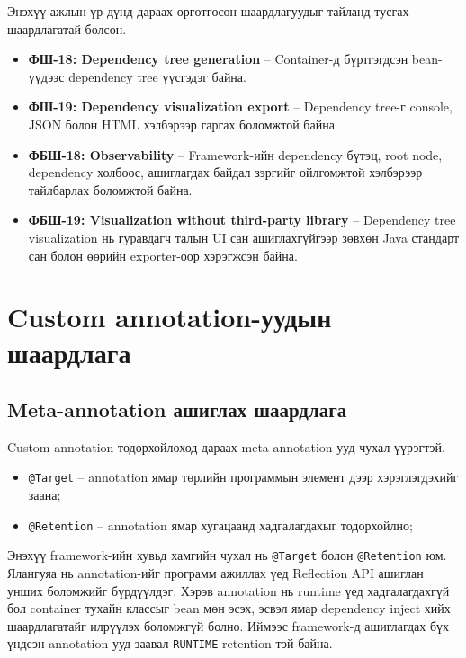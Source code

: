 Энэхүү ажлын үр дүнд дараах өргөтгөсөн шаардлагуудыг тайланд тусгах шаардлагатай болсон.
\begin{itemize}
    \item \textbf{ФШ-18: Dependency tree generation} -- Container-д бүртгэгдсэн bean-үүдээс dependency tree үүсгэдэг байна.
    \item \textbf{ФШ-19: Dependency visualization export} -- Dependency tree-г console, JSON болон HTML хэлбэрээр гаргах боломжтой байна.
    \item \textbf{ФБШ-18: Observability} -- Framework-ийн dependency бүтэц, root node, dependency холбоос, ашиглагдах байдал зэргийг ойлгомжтой хэлбэрээр тайлбарлах боломжтой байна.
    \item \textbf{ФБШ-19: Visualization without third-party library} -- Dependency tree visualization нь гуравдагч талын UI сан ашиглахгүйгээр зөвхөн Java стандарт сан болон өөрийн exporter-оор хэрэгжсэн байна.
\end{itemize}


\section{Custom annotation-уудын шаардлага}


\subsection{Meta-annotation ашиглах шаардлага}

Custom annotation тодорхойлоход дараах meta-annotation-ууд чухал үүрэгтэй.
\begin{itemize}
    \item \texttt{@Target} -- annotation ямар төрлийн программын элемент дээр хэрэглэгдэхийг заана;
    \item \texttt{@Retention} -- annotation ямар хугацаанд хадгалагдахыг тодорхойлно;
\end{itemize}

Энэхүү framework-ийн хувьд хамгийн чухал нь \texttt{@Target} болон
\texttt{@Retention} юм. Ялангуяа
 нь annotation-ийг
программ ажиллах үед Reflection API ашиглан унших боломжийг
бүрдүүлдэг. Хэрэв annotation нь runtime үед хадгалагдахгүй бол
container тухайн классыг bean мөн эсэх, эсвэл ямар dependency inject
хийх шаардлагатайг илрүүлэх боломжгүй болно. Иймээс framework-д
ашиглагдах бүх үндсэн annotation-ууд заавал \texttt{RUNTIME}
retention-тэй байна.


